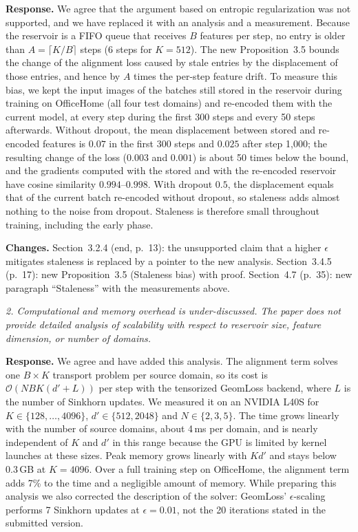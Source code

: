 \documentclass[11pt]{article}
\newenvironment{comment}{\par\medskip\noindent\begin{minipage}{\linewidth}\color{revcol}\itshape}{\end{minipage}\par\smallskip}
\newcommand{\resp}{\noindent\textbf{Response.} }
\newcommand{\chg}{\noindent\textbf{Changes.} }
\begin{document}
\resp We agree that the argument based on entropic regularization was not supported, and we have replaced it with an analysis and a measurement. Because the reservoir is a FIFO queue that receives $B$ features per step, no entry is older than $A=\lceil K/B\rceil$ steps (6 steps for $K=512$). The new Proposition~3.5 bounds the change of the alignment loss caused by stale entries by the displacement of those entries, and hence by $A$ times the per-step feature drift. To measure this bias, we kept the input images of the batches still stored in the reservoir during training on OfficeHome (all four test domains) and re-encoded them with the current model, at every step during the first 300 steps and every 50 steps afterwards. Without dropout, the mean displacement between stored and re-encoded features is $0.07$ in the first 300 steps and $0.025$ after step 1,000; the resulting change of the loss ($0.003$ and $0.001$) is about 50 times below the bound, and the gradients computed with the stored and with the re-encoded reservoir have cosine similarity $0.994$--$0.998$. With dropout $0.5$, the displacement equals that of the current batch re-encoded without dropout, so staleness adds almost nothing to the noise from dropout. Staleness is therefore small throughout training, including the early phase.

\chg Section~3.2.4 (end, p.~13): the unsupported claim that a higher $\epsilon$ mitigates staleness is replaced by a pointer to the new analysis. Section~3.4.5 (p.~17): new Proposition~3.5 (Staleness bias) with proof. Section~4.7 (p.~35): new paragraph ``Staleness'' with the measurements above.

\begin{comment}
2. Computational and memory overhead is under-discussed. The paper does not provide detailed analysis of scalability with respect to reservoir size, feature dimension, or number of domains.
\end{comment}

\resp We agree and have added this analysis. The alignment term solves one $B\times K$ transport problem per source domain, so its cost is $\mathcal O(NBK(d'+L))$ per step with the tensorized GeomLoss backend, where $L$ is the number of Sinkhorn updates. We measured it on an NVIDIA L40S for $K\in\{128,\dots,4096\}$, $d'\in\{512,2048\}$ and $N\in\{2,3,5\}$. The time grows linearly with the number of source domains, about 4\,ms per domain, and is nearly independent of $K$ and $d'$ in this range because the GPU is limited by kernel launches at these sizes. Peak memory grows linearly with $Kd'$ and stays below 0.3\,GB at $K=4096$. Over a full training step on OfficeHome, the alignment term adds 7\% to the time and a negligible amount of memory. While preparing this analysis we also corrected the description of the solver: GeomLoss' $\epsilon$-scaling performs 7 Sinkhorn updates at $\epsilon=0.01$, not the 20 iterations stated in the submitted version.
\end{document}
